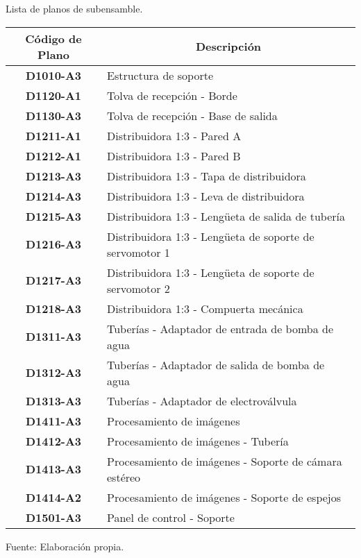 \begin{mytable}[H]
	\scriptsize\centering
	\caption{Lista de planos de subensamble.}
	\label{tab:lista de planos de subensamble}
	\begin{tabular}{|c|l|}
		\hline
		\multicolumn{1}{|c|}{\textbf{Código de Plano}} & \multicolumn{1}{c|}{\textbf{Descripción}} \\ \hline
		\textbf{D1010-A3}         & Estructura de soporte  \\ \hline
		\textbf{D1120-A1}         & Tolva de recepción - Borde \\ \hline
		\textbf{D1130-A3}         & Tolva de recepción - Base de salida \\ \hline
		\textbf{D1211-A1}         & Distribuidora 1:3 - Pared A \\ \hline
		\textbf{D1212-A1}         & Distribuidora 1:3 - Pared B \\ \hline
		\textbf{D1213-A3}         & Distribuidora 1:3 - Tapa de distribuidora \\ \hline
		\textbf{D1214-A3}         & Distribuidora 1:3 - Leva de distribuidora \\ \hline
		\textbf{D1215-A3}         & Distribuidora 1:3 - Lengüeta de salida de tubería \\ \hline
		\textbf{D1216-A3}         & Distribuidora 1:3 - Lengüeta de soporte de servomotor 1 \\ \hline
		\textbf{D1217-A3}         & Distribuidora 1:3 - Lengüeta de soporte de servomotor 2 \\ \hline 
		\textbf{D1218-A3}         & Distribuidora 1:3 - Compuerta mecánica \\ \hline 
		\textbf{D1311-A3}         & Tuberías - Adaptador de entrada de bomba de agua \\ \hline 
		\textbf{D1312-A3}         & Tuberías - Adaptador de salida de bomba de agua \\ \hline 
		\textbf{D1313-A3}         & Tuberías - Adaptador de electroválvula\\ \hline
		\textbf{D1411-A3}         & Procesamiento de imágenes \\ \hline
		\textbf{D1412-A3}         & Procesamiento de imágenes - Tubería \\ \hline
		\textbf{D1413-A3}         & Procesamiento de imágenes - Soporte de cámara estéreo \\ \hline
		\textbf{D1414-A2}         & Procesamiento de imágenes - Soporte de espejos \\ \hline
		\textbf{D1501-A3}         & Panel de control - Soporte \\ \hline
	\end{tabular}
	\begin{myflushcenteraftertable}	
		Fuente: Elaboración propia.
	\end{myflushcenteraftertable}
\end{mytable}

